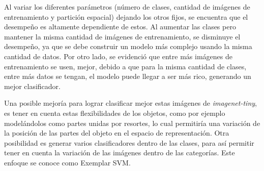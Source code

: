 \documentclass[10pt,twocolumn,letterpaper]{article}
\begin{document}
Al variar los diferentes parámetros (número de clases, cantidad de imágenes de entrenamiento y partición espacial) dejando los otros fijos, se encuentra que el desempeño es altamente dependiente de estos. Al aumentar las clases pero mantener la misma cantidad de imágenes de entrenamiento, se disminuye el desempeño, ya que se debe construir un modelo más complejo usando la misma cantidad de datos. Por otro lado, se evidenció que entre más imágenes de entrenamiento se usen, mejor, debido a que para la misma cantidad de clases, entre más datos se tengan, el modelo puede llegar a ser más rico, generando un mejor clasificador. 

Una posible mejoría para lograr clasificar mejor estas imágenes de \textit{imagenet-tiny}, es tener en cuenta estas flexibilidades de los objetos, como por ejemplo modelándolos como partes unidas por resortes, lo cual permitiría una variación de la posición de las partes del objeto en el espacio de representación. Otra posibilidad es generar varios clasificadores dentro de las clases, para así permitir tener en cuenta la variación de las imágenes dentro de las categorías. Este enfoque se conoce como Exemplar SVM.


{\small


}
\end{document}
